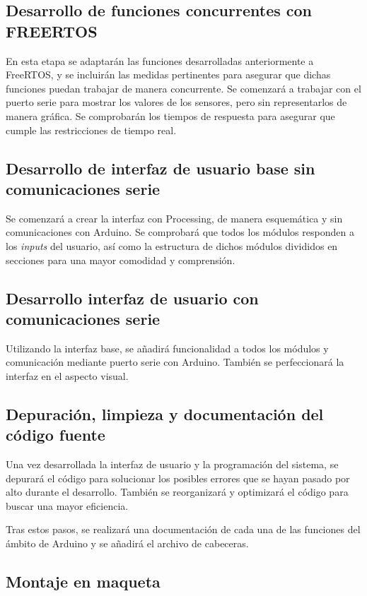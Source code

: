\subsection{Desarrollo de funciones concurrentes con FREERTOS}

En esta etapa se adaptarán las funciones desarrolladas anteriormente a FreeRTOS, y se incluirán las medidas pertinentes para asegurar que dichas funciones puedan trabajar de manera concurrente. Se comenzará a trabajar con el puerto serie para mostrar los valores de los sensores, pero sin representarlos de manera gráfica. Se comprobarán los tiempos de respuesta para asegurar que cumple las restricciones de tiempo real. 

\subsection{Desarrollo de interfaz de usuario base sin comunicaciones serie}

Se comenzará a crear la interfaz con Processing, de manera esquemática y sin comunicaciones con Arduino. Se comprobará que todos los módulos responden a los \textit{inputs} del usuario, así como la estructura de dichos módulos divididos en secciones para una mayor comodidad y comprensión.

\subsection{Desarrollo interfaz de usuario con comunicaciones serie}

Utilizando la interfaz base, se añadirá funcionalidad a todos los módulos y comunicación mediante puerto serie con Arduino. También se perfeccionará la interfaz en el aspecto visual. 

\subsection{Depuración, limpieza y documentación del código fuente}

Una vez desarrollada la interfaz de usuario y la programación del sistema, se depurará el código para solucionar los posibles errores que se hayan pasado por alto durante el desarrollo. También se reorganizará y optimizará el código para buscar una mayor eficiencia. 

Tras estos pasos, se realizará una documentación de cada una de las funciones del ámbito de Arduino y se añadirá el archivo de cabeceras. 

\subsection{Montaje en maqueta } 

